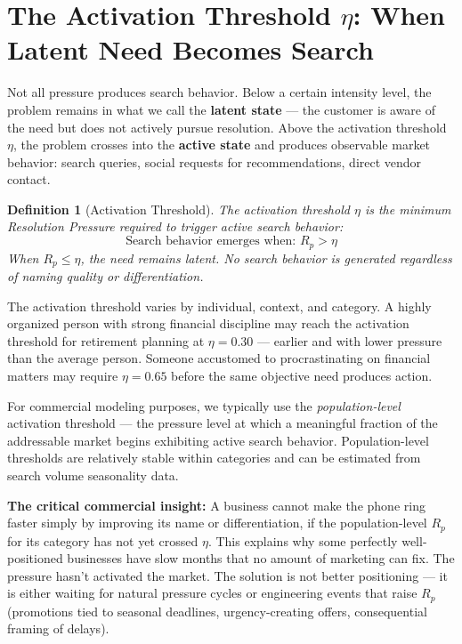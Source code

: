 \documentclass[12pt, openany]{book}
\theoremstyle{thmstyle}
\theoremstyle{defstyle}
\newtheorem{definition}{Definition}[chapter]
\begin{document}
\section{The Activation Threshold $\eta$: When Latent Need Becomes Search}

Not all pressure produces search behavior. Below a certain intensity level, the problem remains in what we call the \textbf{latent state} --- the customer is aware of the need but does not actively pursue resolution. Above the activation threshold $\eta$, the problem crosses into the \textbf{active state} and produces observable market behavior: search queries, social requests for recommendations, direct vendor contact.

\begin{definition}[Activation Threshold]
The activation threshold $\eta$ is the minimum Resolution Pressure required to trigger active search behavior:
\begin{equation}
\text{Search behavior emerges when: } R_p > \eta
\label{eq:activation}
\end{equation}
When $R_p \leq \eta$, the need remains latent. No search behavior is generated regardless of naming quality or differentiation.
\end{definition}

The activation threshold varies by individual, context, and category. A highly organized person with strong financial discipline may reach the activation threshold for retirement planning at $\eta = 0.30$ --- earlier and with lower pressure than the average person. Someone accustomed to procrastinating on financial matters may require $\eta = 0.65$ before the same objective need produces action.

For commercial modeling purposes, we typically use the \textit{population-level} activation threshold --- the pressure level at which a meaningful fraction of the addressable market begins exhibiting active search behavior. Population-level thresholds are relatively stable within categories and can be estimated from search volume seasonality data.

\textbf{The critical commercial insight:} A business cannot make the phone ring faster simply by improving its name or differentiation, if the population-level $R_p$ for its category has not yet crossed $\eta$. This explains why some perfectly well-positioned businesses have slow months that no amount of marketing can fix. The pressure hasn't activated the market. The solution is not better positioning --- it is either waiting for natural pressure cycles or engineering events that raise $R_p$ (promotions tied to seasonal deadlines, urgency-creating offers, consequential framing of delays).
\end{document}
